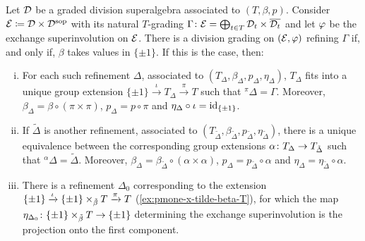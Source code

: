 \begin{thm}\label{thm:refinement-DxDsop}
	Let $\mathcal{D}$ be a graded division superalgebra associated to $(T, \beta, p)$.
	Consider $\mathcal E \coloneqq \mathcal{D} \times \mathcal{D}^{\mathrm{sop}}$ with its natural $T$-grading $\Gamma\colon \mathcal E = \bigoplus_{t\in T} \mathcal{D}_t \times \overline{\mathcal{D}_t}$ and let $\varphi$ be the exchange superinvolution on $\mathcal E$.
	There is a division grading on $(\mathcal E, \varphi)$ refining $\Gamma$ if, and only if, $\beta$ takes values in $\{ \pm 1 \}$.
	If this is the case, then: 
	\begin{enumerate}[(i)]
		\item For each such refinement $\Delta$, associated to $(T_\Delta, \beta_\Delta, p_\Delta, \eta_\Delta)$, $T_\Delta$ fits into a unique group extension $\{ \pm 1 \} \xrightarrow{\iota} T_\Delta \xrightarrow{\pi} T$ such that ${}^{\pi} \Delta = \Gamma$. 
		Moreover, $\beta_\Delta = \beta \circ (\pi \times \pi)$, $p_\Delta = p \circ \pi$ and $\eta_\Delta \circ \iota = \operatorname{id}_{\{ \pm 1 \}}$.
		\label{item:there-is-extension}
		\item If $\tilde \Delta$ is another refinement, associated to $(T_{\tilde\Delta}, \beta_{\tilde\Delta}, p_{\tilde\Delta}, \eta_{\tilde\Delta})$, there is a unique equivalence between the corresponding group extensions $\alpha\colon T_\Delta \to T_{\tilde\Delta}$ such that ${}^\alpha \Delta = \tilde \Delta$. 
		Moreover, $\beta_\Delta = \beta_{\tilde\Delta} \circ (\alpha \times \alpha)$, $p_\Delta = p_{\tilde\Delta} \circ \alpha$ and $\eta_\Delta = \eta_{\tilde\Delta} \circ \alpha$.
        \label{item:number-of-extensions}
		\item There is a refinement $\Delta_0$ corresponding to the extension $\{ \pm 1 \} \xrightarrow{\iota} \{ \pm 1 \} \times_{\tilde\beta} T \xrightarrow{\pi} T$ (\cref{ex:pmone-x-tilde-beta-T}), for which the map $\eta_{\Delta_0}\colon \{ \pm 1 \} \times_{\tilde\beta} T \to \{ \pm 1 \}$ determining the exchange superinvolution is the projection onto the first component. 
		\label{item:pmone-x-T}
	\end{enumerate}
\end{thm}

